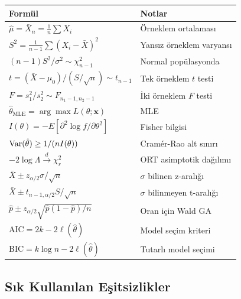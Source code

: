 \begin{center}
\renewcommand{\arraystretch}{1.5}
\small
\begin{tabular}{p{5cm}p{7cm}}
\hline
\textbf{Formül} & \textbf{Notlar} \\
\hline
$\hat\mu=\bar X_n=\frac{1}{n}\sum X_i$ & Örneklem ortalaması \\
$S^2=\frac{1}{n-1}\sum(X_i-\bar X)^2$ & Yansız örneklem varyansı \\
$(n-1)S^2/\sigma^2\sim\chi^2_{n-1}$ & Normal popülasyonda \\
$t=(\bar X-\mu_0)/(S/\sqrt{n})\sim t_{n-1}$ & Tek örneklem $t$ testi \\
$F=s_1^2/s_2^2\sim F_{n_1-1,n_2-1}$ & İki örneklem $F$ testi \\
$\hat\theta_{\mathrm{MLE}}=\arg\max L(\theta;\mathbf{x})$ & MLE \\
$I(\theta)=-E[\partial^2\log f/\partial\theta^2]$ & Fisher bilgisi \\
$\operatorname{Var}(\hat\theta)\geq 1/(nI(\theta))$ & Cramér-Rao alt sınırı \\
$-2\log\Lambda\xrightarrow{d}\chi^2_r$ & ORT asimptotik dağılımı \\
$\bar X\pm z_{\alpha/2}\sigma/\sqrt{n}$ & $\sigma$ bilinen z-aralığı \\
$\bar X\pm t_{n-1,\alpha/2}S/\sqrt{n}$ & $\sigma$ bilinmeyen t-aralığı \\
$\hat p\pm z_{\alpha/2}\sqrt{\hat p(1-\hat p)/n}$ & Oran için Wald GA \\
AIC$=2k-2\ell(\hat\theta)$ & Model seçim kriteri \\
BIC$=k\log n-2\ell(\hat\theta)$ & Tutarlı model seçimi \\
\hline
\end{tabular}
\end{center}

\subsection{Sık Kullanılan Eşitsizlikler}


